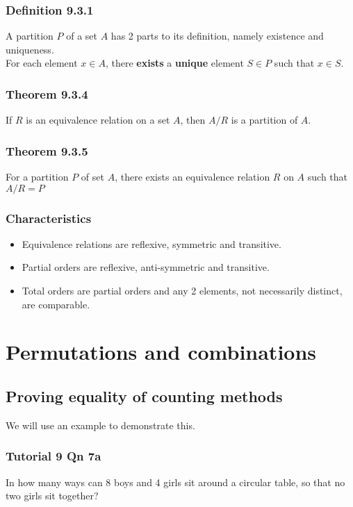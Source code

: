 \documentclass{article}
\begin{document}
\subsubsection{Definition 9.3.1}
A partition $P$ of a set $A$ has 2 parts to its definition, namely existence and uniqueness.\\ 
For each element $x\in A$, there \textbf{exists} a \textbf{unique} element $S\in P$ such that $x\in S$.

\subsubsection{Theorem 9.3.4}
If $R$ is an equivalence relation on a set $A$, then $A/R$ is a partition of $A$.

\subsubsection{Theorem 9.3.5}
For a partition $P$ of set $A$, there exists an equivalence relation $R$ on $A$ such that $A/R=P$

\subsubsection{Characteristics}
\begin{itemize}
	\item Equivalence relations are reflexive, symmetric and transitive.
	\item Partial orders are reflexive, anti-symmetric and transitive.
	\item Total orders are partial orders and any 2 elements, not necessarily distinct, are comparable.
\end{itemize}

\section{Permutations and combinations}
\subsection{Proving equality of counting methods}
We will use an example to demonstrate this.
\subsubsection{Tutorial 9 Qn 7a}
In how many ways can 8 boys and 4 girls sit around a circular table, so that no two girls sit together?
\end{document}
